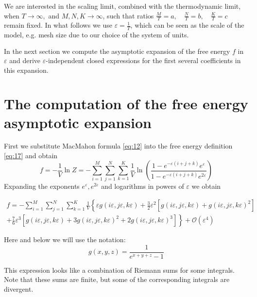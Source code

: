\documentclass{article}
\begin{document}
We are interested in the scaling limit, combined with the thermodynamic limit, when $ T\to \infty,$
and $M,N,K\to \infty$, such that ratios $\frac{M}{T}=a,\quad \frac{N}{T}=b, \quad \frac{K}{T}=c$
remain fixed. In what follows we use $\varepsilon=\frac{1}{T}$, which can be seen as the scale of
the model, e.g. mesh size due to our choice of the system of units.

In the next section we compute the asymptotic expansion of the free energy $f$ in $\varepsilon$ and
derive $\varepsilon$-independent closed expressions for the first several coefficients in this
expansion.
  
\section{The computation of the free energy asymptotic expansion}
\label{sec:free-energy-scaling}
First we substitute MacMahon formula \eqref{eq:12} into the free energy definition \eqref{eq:17} and
obtain
\begin{equation}
  \label{eq:20}
    f=-\frac{1}{V}\ln Z =- \sum_{i=1}^{M} \sum_{j=1}^{N} \sum_{k=1}^{K} \frac{1}{V}
  \ln\left(\frac{1-e^{-\varepsilon (i+j+k)} e^{\varepsilon}}{1-e^{-\varepsilon (i+j+k)} e^{2\varepsilon}}\right)
\end{equation}
Expanding the exponents $e^{\varepsilon}, e^{2\varepsilon}$ and logarithms in powers of $\varepsilon$ we obtain


\begin{multline}
  \label{eq:4}
  f=- \sum_{i=1}^{M} \sum_{j=1}^{N} \sum_{k=1}^{K} \frac{1}{V}\left\{
    \varepsilon g(i\varepsilon,j\varepsilon,k\varepsilon)+
    \frac{3}{2}\varepsilon^{2}\left[g(i\varepsilon,j\varepsilon,k\varepsilon)+g(i\varepsilon,j\varepsilon,k\varepsilon)^{2}\right]\right.\\
  \left.+\frac{7}{6}\varepsilon^{3}\left[g(i\varepsilon,j\varepsilon,k\varepsilon)+3 g(i\varepsilon,j\varepsilon,k\varepsilon)^{2}+
      2 g(i\varepsilon,j\varepsilon,k\varepsilon)^{3}\right]\right\}  + \mathcal{O}(\varepsilon^{4})
\end{multline}

Here and below we will use the notation:
\begin{equation}
  \label{eq:5}
  g(x,y,z)=\frac{1}{e^{x+y+z}-1}
\end{equation}

This expression looks like a combination of Riemann sums for some integrals. Note that these sums
are finite, but some of the corresponding integrals are divergent.
\end{document}
